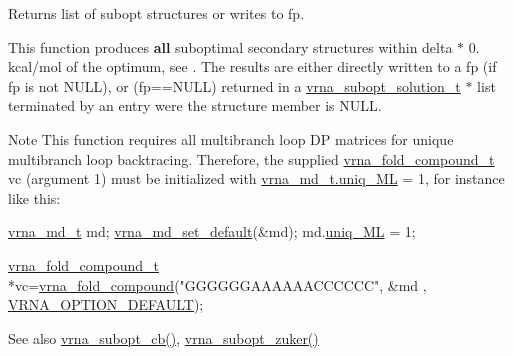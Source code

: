 Returns list of subopt structures or writes to fp. 

This function produces {\bfseries all} suboptimal secondary structures within \textquotesingle{}delta\textquotesingle{} $\ast$ 0. kcal/mol of the optimum, see \cite{wuchty:1999}. The results are either directly written to a \textquotesingle{}fp\textquotesingle{} (if \textquotesingle{}fp\textquotesingle{} is not N\+U\+LL), or (fp==N\+U\+LL) returned in a \mbox{\hyperlink{subopt_8h_a01ae9a0f27d245d89f705afd843fc457}{vrna\+\_\+subopt\+\_\+solution\+\_\+t}} $\ast$ list terminated by an entry were the \textquotesingle{}structure\textquotesingle{} member is N\+U\+LL.

\begin{DoxyNote}{Note}
This function requires all multibranch loop DP matrices for unique multibranch loop backtracing. Therefore, the supplied \mbox{\hyperlink{group__fold__compound_ga1b0cef17fd40466cef5968eaeeff6166}{vrna\+\_\+fold\+\_\+compound\+\_\+t}} {\ttfamily vc} (argument 1) must be initialized with \mbox{\hyperlink{group__model__details_ade065b814a4e2e72ead93ab502613ed2}{vrna\+\_\+md\+\_\+t.\+uniq\+\_\+\+ML}} = 1, for instance like this\+: 
\begin{DoxyCode}
\mbox{\hyperlink{group__model__details_structvrna__md__s}{vrna\_md\_t}} md;
\mbox{\hyperlink{group__model__details_ga8ac6ff84936282436f822644bf841f66}{vrna\_md\_set\_default}}(&md);
md.\mbox{\hyperlink{group__model__details_ade065b814a4e2e72ead93ab502613ed2}{uniq\_ML}} = 1;

\mbox{\hyperlink{group__fold__compound_structvrna__fc__s}{vrna\_fold\_compound\_t}} *vc=\mbox{\hyperlink{group__fold__compound_ga6601d994ba32b11511b36f68b08403be}{vrna\_fold\_compound}}(\textcolor{stringliteral}{"GGGGGGAAAAAACCCCCC"}, &md
      , \mbox{\hyperlink{group__fold__compound_gacea5b7ee6181c485f36e2afa0e9089e4}{VRNA\_OPTION\_DEFAULT}});
\end{DoxyCode}

\end{DoxyNote}
\begin{DoxySeeAlso}{See also}
\mbox{\hyperlink{group__subopt__wuchty_ga1053837e6b6f158093508f8a70998352}{vrna\+\_\+subopt\+\_\+cb()}}, \mbox{\hyperlink{group__subopt__zuker_gababde9d210eb433854f1e71da7815fbb}{vrna\+\_\+subopt\+\_\+zuker()}} 
\end{DoxySeeAlso}

